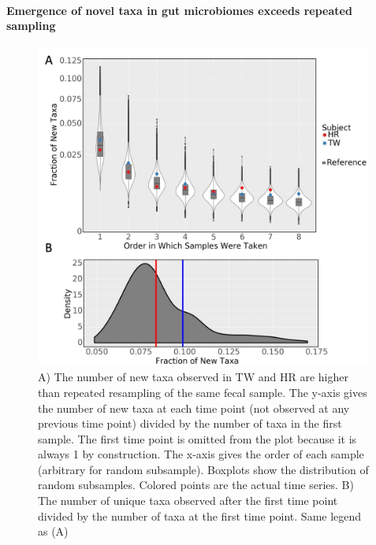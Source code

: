 \paragraph{Emergence of novel taxa in gut microbiomes exceeds repeated sampling} 

\begin{figure}
  \begin{center}
    \includegraphics[width=0.99\textwidth]{figs/taxa_repeated_sampling.jpg}
	\caption{\small{
	    A) The number of new taxa observed in TW and HR are higher than repeated resampling of the same fecal sample. The y-axis gives the number of new taxa at each time point (not observed at any previous time point) divided by the number of taxa in the first sample. The first time point is omitted from the plot because it is always 1 by construction. The x-axis gives the order of each sample (arbitrary for random subsample). Boxplots show the distribution of random subsamples. Colored points are the actual time series.
	    B) The number of unique taxa observed after the first time point divided by the number of taxa at the first time point. Same legend as (A)
	}}
    \label{fig:taxarepeated}
  \end{center}
\end{figure}

